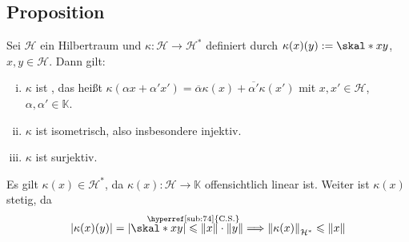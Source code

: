 \subsection[Proposition: Isometrischer Isomorphismus $\kappa \colon \mathcal{H} \to \mathcal{H}^*$]{Proposition} %
\label{sub:711}
Sei $\mathcal{H}$ ein Hilbertraum und $\kappa \colon \mathcal{H} \to \mathcal{H}^*$ definiert durch $\kappa(x)(y) := \skal*{x}{y}$, $x,y \in \mathcal{H}$. Dann gilt:
\begin{enumerate}[(i)]
	\item $\kappa$ ist , das heißt $\kappa(\alpha x+ \alpha' x') = \overline{\alpha} \kappa(x) + \overline{\alpha'}\kappa(x')$ mit 
	$x,x' \in \mathcal{H}$, $\alpha, \alpha' \in \mathds{K}$.
	\item $\kappa$ ist isometrisch, also insbesondere injektiv.
	\item $\kappa$ ist surjektiv.
\end{enumerate}
Es gilt $\kappa(x) \in \mathcal{H}^*$, da $\kappa(x) \colon \mathcal{H} \to \mathds{K}$ offensichtlich linear ist. Weiter ist $\kappa(x)$ stetig, da
\begin{align*}
	\abs*{\kappa(x)(y)}= \abs*{\skal*{x}{y}} \stackrel{\mathclap{\mbox{\scriptsize \hyperref[sub:74]{C.S.}}}}{\le} \norm{x} \cdot \norm{y} 
	\Longrightarrow \norm[\mathcal{H}^*]{\kappa(x)} \le \norm{x}  
\end{align*}
